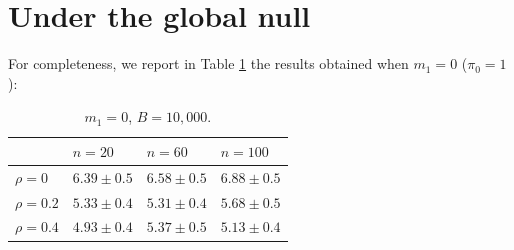 \documentclass{article}
\begin{document}
\section{Under the global null}
For completeness, we report in Table \ref{tab:0-4} the results obtained when $m_1=0$ ($\pi_0=1$):
\begin{table}[ht]
\centering
\begin{tabular}{llll}
  \hline
 & $n=20$ & $n=60$ & $n=100$ \\ 
  \hline
$\rho=0$ & $6.39\pm0.5$ & $6.58\pm0.5$ & $6.88\pm0.5$ \\ 
  $\rho=0.2$ & $5.33\pm0.4$ & $5.31\pm0.4$ & $5.68\pm0.5$ \\ 
  $\rho=0.4$ & $4.93\pm0.4$ & $5.37\pm0.5$ & $5.13\pm0.4$ \\ 
   \hline
\end{tabular}
\caption{$m_1=0$, $B=10,000$.} 
\label{tab:0-4}
\end{table}



\end{document}
